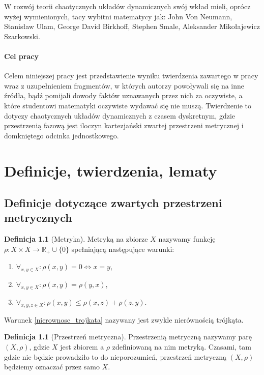 \documentclass[licencjacka]{pwr_wmat_praca_dyplomowa}
\theoremstyle{plain}
\numberwithin{theorem}{chapter}
\theoremstyle{definition}
\numberwithin{theorem}{chapter}
\newtheorem{definition}[theorem]{Definicja}
\begin{document}
W rozwój teorii chaotycznych układów dynamicznych swój wkład mieli, oprócz wyżej wymienionych, tacy wybitni matematycy jak: John Von Neumann, Stanisław Ulam, George David Birkhoff, Stephen Smale, Aleksander Mikołajewicz Szarkowski.



\subsubsection{Cel pracy}
Celem niniejszej pracy jest przedstawienie wyniku twierdzenia zawartego w pracy \cite{balibrea2003topological} wraz z uzupełnieniem fragmentów, w których autorzy powoływali się na inne źródła, bądź pomijali dowody faktów uznawanych przez nich za oczywiste, a które studentowi matematyki oczywiste wydawać się nie muszą. Twierdzenie to dotyczy chaotycznych układów dynamicznych z czasem dyskretnym, gdzie przestrzenią fazową jest iloczyn kartezjański zwartej przestrzeni metrycznej i domkniętego odcinka jednostkowego.




\chapter{Definicje, twierdzenia, lematy}

\section{Definicje dotyczące zwartych przestrzeni metrycznych}

\begin{definition}[Metryka]
Metryką na zbiorze $X$ nazywamy funkcję $\rho : X \times X \longrightarrow \mathbb{R}_+ \cup \{0\}$ spełniającą następujące warunki:
\begin{enumerate}
\item $\forall_{x,y \in X}: \rho(x,y)=0 \iff x=y$,
\item $\forall_{x,y \in X}: \rho(x,y) = \rho(y,x)$,
\item \label{nierownosc_trojkata} $\forall_{x,y,z \in X}: \rho(x,y) \leq \rho(x,z) + \rho(z,y)$.
\end{enumerate}
Warunek \ref{nierownosc_trojkata} nazywany jest zwykle nierównością trójkąta.

\end{definition}

\begin{definition}[Przestrzeń metryczna]
Przestrzenią metryczną nazywamy parę $(X, \rho)$, gdzie $X$ jest zbiorem a $\rho$ zdefiniowaną na nim metryką. Czasami, tam gdzie nie będzie prowadziło to do nieporozumień, przestrzeń metryczną $(X, \rho)$ będziemy oznaczać przez samo $X$.
\end{definition}
\end{document}
